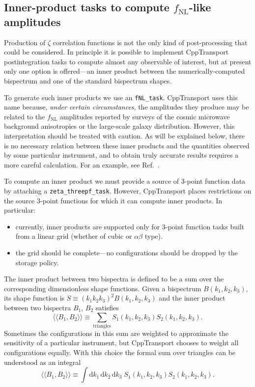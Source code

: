 \documentclass[11pt,a4paper]{article}
\renewcommand{\d}{\mathrm{d}}
\newcommand{\fNL}{f_{\mathrm{NL}}}
\newcommand{\packagefont}{\sffamily}
\newcommand{\CppTransport}{{\packagefont CppTransport}}
\newcommand{\iprod}[2]{\langle\!\langle {#1}, {#2} \rangle\!\rangle}
\begin{document}
\subsection{Inner-product tasks to compute $\fNL$-like amplitudes}
\label{sec:inner-products}
Production of $\zeta$ correlation functions 
is not the only kind of post-processing that could be
considered.
In principle it is possible to implement {\CppTransport} postintegration
tasks to compute almost any observable of interest,
but at present only one option is offered---an inner product between the
numerically-computed bispectrum and one of the standard bispectrum shapes.

To generate such inner products we use an
\texttt{fNL_task}.
{\CppTransport} uses this name because, \emph{under certain circumstances},
the amplitudes they produce may be related to the $\fNL$ amplitudes
reported by surveys of the cosmic microwave background anisotropies
or the large-scale galaxy distribution.
However, this interpretation should be treated with caution.
As will be explained below,
there is no necessary relation between these inner products and
the quantities observed by some particular instrument,
and to obtain truly accurate results requires a more careful calculation.
For an example, see Ref.~\cite{Byrnes:2015dub}.

To compute an inner product
we must provide a source of 3-point function
data by attaching a \texttt{zeta_threepf_task}.
However, {\CppTransport} places restrictions on the
source 3-point functions for which it can compute inner products.
In particular:
\begin{itemize}
	\item currently, inner products are supported only for
	3-point function tasks built from a linear grid
	(whether of cubic or $\alpha\beta$ type).
	\item the grid should be complete---no configurations should
	be dropped by the storage policy.
\end{itemize}

The inner product between two bispectra is defined to be
a sum over the corresponding dimensionless shape functions.
Given a bispectrum $B(k_1, k_2, k_3)$, its shape function is
$S \equiv (k_1 k_2 k_3)^2 B(k_1, k_2, k_3)$
and the inner product between two bispectra
$B_1$, $B_2$ satisfies~\cite{Babich:2004gb,Fergusson:2009nv}
\begin{equation}
	\iprod{B_1}{B_2} \equiv
	\sum_{\text{triangles}}
	S_1(k_1, k_2, k_3) S_2(k_1, k_2, k_3) .	
	\label{eq:inner-product}
\end{equation}
Sometimes the configurations in this sum are weighted
to approximate the sensitivity of a particular instrument,
but {\CppTransport} chooses to weight all configurations equally.
With this choice
the formal sum over triangles can be understood as an integral
\begin{equation}
	\iprod{B_1}{B_2} \equiv
	\int \d k_1 \, \d k_2 \, \d k_3 \;
	S_1(k_1, k_2, k_3) S_2(k_1, k_2, k_3) .	
\end{equation}
\end{document}
